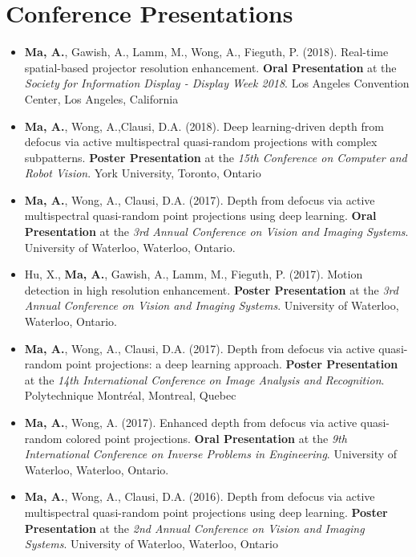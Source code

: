 \section*{Conference Presentations}
\vspace{\postsubhead}
\begin{adjustwidth}{\indentleft}{\indentright}
 \begin{itemize}
            
    \item \textbf{Ma, A.}, Gawish, A., Lamm, M., Wong, A., Fieguth, P. (2018). Real-time spatial-based projector resolution enhancement. \textbf{Oral Presentation} at the \emph{Society for Information Display - Display Week 2018}. Los Angeles Convention Center, Los Angeles, California
    
    \item \textbf{Ma, A.}, Wong, A.,Clausi, D.A. (2018). Deep learning-driven depth from defocus via active multispectral quasi-random projections with complex subpatterns. \textbf{Poster Presentation} at the \emph{15th Conference on Computer and Robot Vision}. York University, Toronto, Ontario
            
    \item \textbf{Ma, A.}, Wong, A., Clausi, D.A. (2017). Depth from defocus via active multispectral quasi-random point projections using deep learning. \textbf{Oral Presentation} at the \emph{3rd Annual Conference on Vision and Imaging Systems}. University of Waterloo, Waterloo, Ontario.
    
    \item Hu, X., \textbf{Ma, A.}, Gawish, A., Lamm, M., Fieguth, P. (2017). Motion detection in high resolution enhancement. \textbf{Poster Presentation} at the \emph{3rd Annual Conference on Vision and Imaging Systems}. University of Waterloo, Waterloo, Ontario.
    
    \item \textbf{Ma, A.}, Wong, A., Clausi, D.A. (2017). Depth from defocus via active quasi-random point projections: a deep learning approach. \textbf{Poster Presentation} at the \emph{14th International Conference on Image Analysis and Recognition}. Polytechnique Montréal, Montreal, Quebec
    
    \item \textbf{Ma, A.}, Wong, A. (2017). Enhanced depth from defocus via active quasi-random colored point projections. \textbf{Oral Presentation} at the \emph{9th International Conference on Inverse Problems in Engineering}. University of Waterloo, Waterloo, Ontario.
    
    \item \textbf{Ma, A.}, Wong, A., Clausi, D.A. (2016). Depth from defocus via active multispectral quasi-random point projections using deep learning. \textbf{Poster Presentation} at the \emph{2nd Annual Conference on Vision and Imaging Systems}. University of Waterloo, Waterloo, Ontario
\end{itemize}
\end{adjustwidth}
